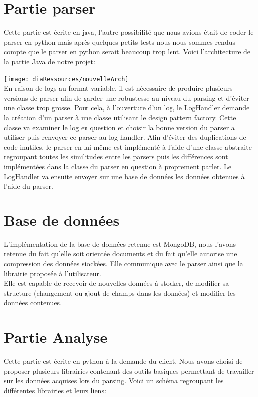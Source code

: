 \section{Partie parser}
Cette partie est écrite en java, l'autre possibilité que nous avions était de coder le parser en python mais après quelques petits tests nous nous sommes rendus compte que le parser en python serait beaucoup trop lent. Voici l'architecture de la partie Java de notre projet:

\texttt{[image: diaRessources/nouvelleArch]}\\

En raison de logs au format variable, il est nécessaire de produire plusieurs versions de parser afin de garder une robustesse au niveau du parsing et d'éviter une classe trop grosse. Pour cela, à l'ouverture d'un log, le LogHandler demande la création d'un parser à une classe utilisant le design pattern factory. Cette classe va examiner le log en question et choisir la bonne version du parser a utiliser puis renvoyer ce parser au log handler. Afin d'éviter des duplications de code inutiles, le parser en lui même est implémenté à l'aide d'une classe abstraite regroupant toutes les similitudes entre les parsers puis les différences sont implémentées dans la classe du parser en question à proprement parler. Le LogHandler va ensuite envoyer sur une base de données les données obtenues à l'aide du parser.

\section{Base de données}
L'implémentation de la base de données retenue est MongoDB, nous l'avons retenue du fait qu'elle soit orientée documents et du fait qu'elle autorise une compression des données stockées. Elle communique avec le parser ainsi que la librairie proposée à l'utilisateur.\\
Elle est capable de recevoir de nouvelles données à stocker, de modifier sa structure (changement ou ajout de champs dans les données) et modifier les données contenues.

\section{Partie Analyse}
Cette partie est écrite en python à la demande du client. Nous avons choisi de proposer plusieurs librairies contenant des outils basiques permettant de travailler sur les données acquises lors du parsing. Voici un schéma regroupant les différentes librairies et leurs liens:

